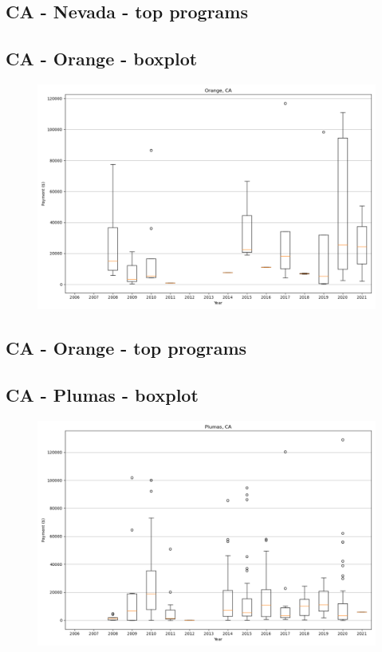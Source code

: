 \subsection*{CA - Nevada - top programs}

\newpage
\subsection*{CA - Orange - boxplot}
\begin{figure}[h]
\centering
\includegraphics[width=7in]{../output/boxplots/counties/Orange-CA_boxplot.png}
\end{figure}


\subsection*{CA - Orange - top programs}

\newpage
\subsection*{CA - Plumas - boxplot}
\begin{figure}[h]
\centering
\includegraphics[width=7in]{../output/boxplots/counties/Plumas-CA_boxplot.png}
\end{figure}


